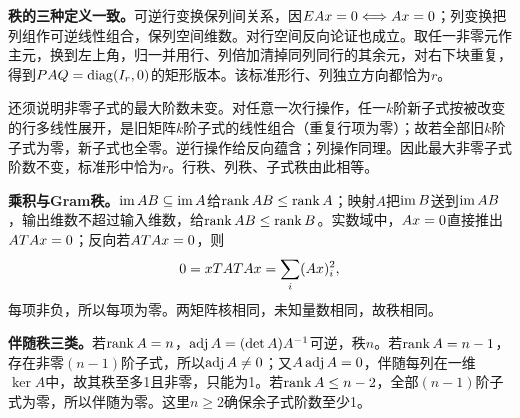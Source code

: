 \label{der:2-3}
\textbf{秩的三种定义一致。}可逆行变换保列间关系，因$EAx=0\Longleftrightarrow Ax=0$；列变换把列组作可逆线性组合，保列空间维数。对行空间反向论证也成立。取任一非零元作主元，换到左上角，归一并用行、列倍加清掉同列同行的其余元，对右下块重复，得到$PAQ=\operatorname{diag}(I_r,0)$的矩形版本。该标准形行、列独立方向都恰为$r$。

还须说明非零子式的最大阶数未变。对任意一次行操作，任一$k$阶新子式按被改变的行多线性展开，是旧矩阵$k$阶子式的线性组合（重复行项为零）；故若全部旧$k$阶子式为零，新子式也全零。逆行操作给反向蕴含；列操作同理。因此最大非零子式阶数不变，标准形中恰为$r$。行秩、列秩、子式秩由此相等。

\textbf{乘积与Gram秩。}$\operatorname{im} AB\subseteq\operatorname{im} A$给$\operatorname{rank} AB\le\operatorname{rank} A$；映射$A$把$\operatorname{im} B$送到$\operatorname{im} AB$，输出维数不超过输入维数，给$\operatorname{rank} AB\le\operatorname{rank} B$。实数域中，$Ax=0$直接推出$AT Ax=0$；反向若$AT Ax=0$，则
\[0=xT AT Ax=\sum_i(Ax)_i^2,\]
每项非负，所以每项为零。两矩阵核相同，未知量数相同，故秩相同。

\textbf{伴随秩三类。}若$\operatorname{rank} A=n$，$\operatorname{adj} A=(\det A)A^{-1}$可逆，秩$n$。若$\operatorname{rank} A=n-1$，存在非零$(n-1)$阶子式，所以$\operatorname{adj} A\ne0$；又$A\operatorname{adj} A=0$，伴随每列在一维$\ker A$中，故其秩至多1且非零，只能为1。若$\operatorname{rank} A\le n-2$，全部$(n-1)$阶子式为零，所以伴随为零。这里$n\ge2$确保余子式阶数至少1。
